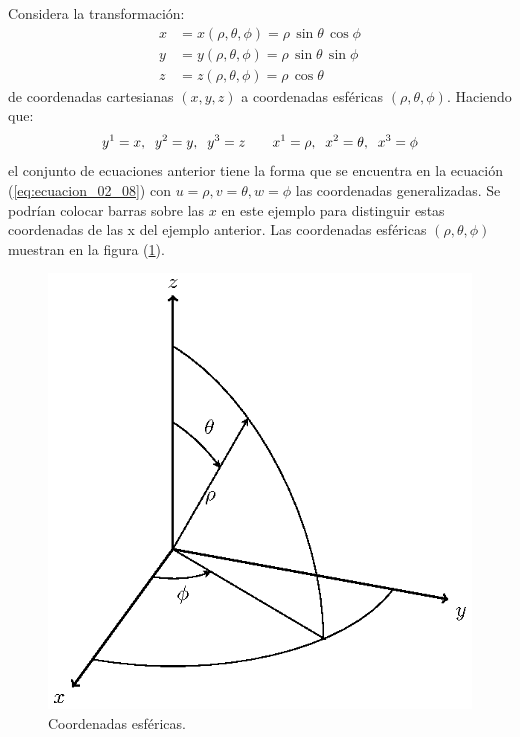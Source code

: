 Considera la transformación:
\begin{align*}
x &= x (\rho, \theta, \phi) = \rho \, \sin \theta \, \cos \phi \\[0.5em]
y &= y (\rho, \theta, \phi) = \rho \, \sin \theta \, \sin \phi \\[0.5em]
z &= z (\rho, \theta, \phi) = \rho \, \cos \theta
\end{align*}
de coordenadas cartesianas $(x, y, z)$ a coordenadas esféricas $(\rho, \theta, \phi)$. Haciendo que:
\begin{align*}
y^{1} = x, \hspace{0.2cm} y^{2} = y, \hspace{0.2cm} y^{3} = z \hspace{0.7cm} x^{1} = \rho, \hspace{0.2cm} x^{2} = \theta, \hspace{0.2cm} x^{3} = \phi
\end{align*}    
el conjunto de ecuaciones anterior tiene la forma que se encuentra en la ecuación (\ref{eq:ecuacion_02_08}) con $u = \rho, v = \theta, w = \phi$ las coordenadas generalizadas. Se podrían colocar barras sobre las $x$ en este ejemplo para distinguir estas coordenadas de las x del ejemplo anterior. Las coordenadas esféricas $(\rho, \theta, \phi)$ muestran en la figura (\ref{fig:figura_02_03}).
\begin{figure}[H]
    \centering
    \includegraphics[scale=1]{Imagenes/Sistema_Esferico.eps}
    \caption{Coordenadas esféricas.}
    \label{fig:figura_02_03}
\end{figure}

